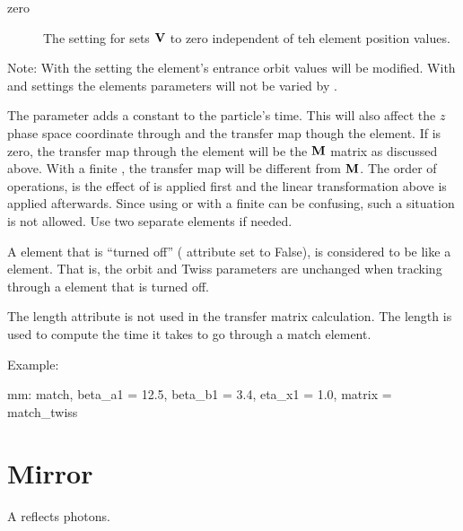 {\begin{description}
%
\item[zero] \Newline
The  setting for  sets ${\bf V}$ to zero independent of teh element position values.
%
\end{description}

Note: With the  setting the element's entrance orbit values will be modified. With
 and  settings the elements parameters will not be varied by \bmad.

The  parameter adds a constant to the particle's time. This will also affect the $z$
phase space coordinate through  and the transfer map though the element. If
 is zero, the transfer map through the element will be the ${\bf M}$ matrix as
discussed above. With a finite , the transfer map will be different from ${\bf M}$.
The order of operations, is the effect of  is applied first and the linear
transformation above is applied afterwards. Since using  or  with
a finite  can be confusing, such a situation is not allowed. Use two separate
 elements if needed.

A  element that is ``turned off'' ( attribute set to False), is considered to be
like a  element. That is, the orbit and Twiss parameters are unchanged when tracking
through a  element that is turned off.

The length attribute  is not used in the transfer matrix calculation. The length  is
used to compute the time it takes to go through a match element.

Example:
\begin{example}
  mm: match, beta_a1 = 12.5, beta_b1 = 3.4, eta_x1 = 1.0, matrix = match_twiss
\end{example}

\newpage

\section{Mirror}
\label{s:mirror}

A  reflects photons. 

}

